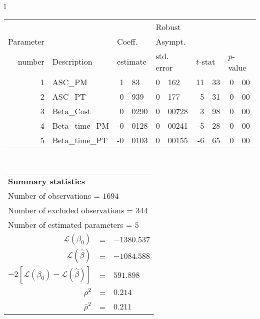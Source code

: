   \begin{tabular}{l}
\begin{tabular}{rlr@{.}lr@{.}lr@{.}lr@{.}l}
         &                       &   \multicolumn{2}{l}{}    & \multicolumn{2}{l}{Robust}  &     \multicolumn{4}{l}{}   \\
Parameter &                       &   \multicolumn{2}{l}{Coeff.}      & \multicolumn{2}{l}{Asympt.}  &     \multicolumn{4}{l}{}   \\
number &  Description                     &   \multicolumn{2}{l}{estimate}      & \multicolumn{2}{l}{std. error}  &   \multicolumn{2}{l}{$t$-stat}  &   \multicolumn{2}{l}{$p$-value}   \\

\hline

1 & ASC_PM  & 1&83 & 0&162 & 11&33 & 0&00\\
2 & ASC_PT & 0&939 & 0&177 & 5&31 & 0&00\\
3 & Beta_Cost & 0&0290 & 0&00728 & 3&98 & 0&00\\
4 & Beta_time_PM & -0&0128 & 0&00241 & -5&28 & 0&00\\
5 & Beta_time_PT & -0&0103 & 0&00155 & -6&65 & 0&00\\
\hline
\end{tabular}
\\
\begin{tabular}{rcl}
\multicolumn{3}{l}{\bf Summary statistics}\\
\multicolumn{3}{l}{ Number of observations = $1694$} \\
\multicolumn{3}{l}{ Number of excluded observations = $344$} \\
\multicolumn{3}{l}{ Number of estimated  parameters = $5$} \\
 $\mathcal{L}(\beta_0)$ &=&  $-1380.537$ \\
 $\mathcal{L}(\hat{\beta})$ &=& $-1084.588 $  \\
 $-2[\mathcal{L}(\beta_0) -\mathcal{L}(\hat{\beta})]$ &=& $591.898$ \\
    $\rho^2$ &=&   $0.214$ \\
    $\bar{\rho}^2$ &=&    $0.211$ \\
\end{tabular}
  \end{tabular}
